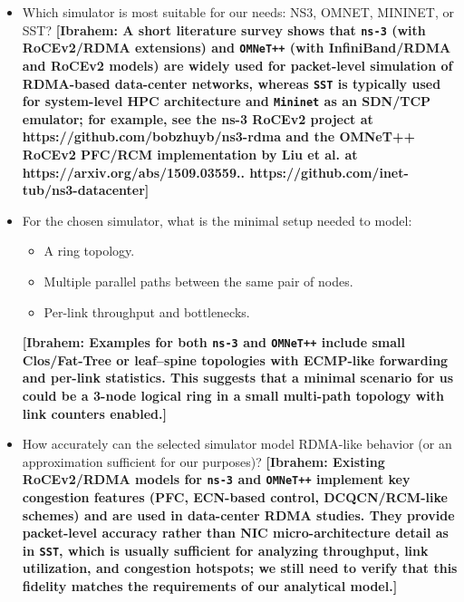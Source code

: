 \documentclass[12pt]{article}
\newcommand{\mycomm}[3]{{\color{#2} \textbf{[#1: #3]}}}
\newcommand{\Ibrahem}[1]{\mycomm{Ibrahem}{blue}{#1}}
\begin{document}
\begin{itemize}[leftmargin=*]
   \item Which simulator is most suitable for our needs: NS3, OMNET, MININET, or SST?
         \Ibrahem{A short literature survey shows that \texttt{ns-3} (with RoCEv2/RDMA extensions) and \texttt{OMNeT++} (with InfiniBand/RDMA and RoCEv2 models) are widely used for packet-level simulation of RDMA-based data-center networks, whereas \texttt{SST} is typically used for system-level HPC architecture and \texttt{Mininet} as an SDN/TCP emulator; for example, see the ns-3 RoCEv2 project at https://github.com/bobzhuyb/ns3-rdma and the OMNeT++ RoCEv2 PFC/RCM implementation by Liu et al. at https://arxiv.org/abs/1509.03559.. \newline https://github.com/inet-tub/ns3-datacenter}

      \item For the chosen simulator, what is the minimal setup needed to model:
        \begin{itemize}
            \item A ring topology.
            \item Multiple parallel paths between the same pair of nodes.
            \item Per-link throughput and bottlenecks.
        \end{itemize}
            \Ibrahem{Examples for both \texttt{ns-3} and \texttt{OMNeT++} include small Clos/Fat-Tree or leaf--spine topologies with ECMP-like forwarding and per-link statistics. This suggests that a minimal scenario for us could be a 3-node logical ring in a small multi-path topology with link counters enabled.}



  \item How accurately can the selected simulator model RDMA-like behavior (or an approximation sufficient for our purposes)?
                \Ibrahem{Existing RoCEv2/RDMA models for \texttt{ns-3} and \texttt{OMNeT++} implement key congestion features (PFC, ECN-based control, DCQCN/RCM-like schemes) and are used in data-center RDMA studies. They provide packet-level accuracy rather than NIC micro-architecture detail as in \texttt{SST}, which is usually sufficient for analyzing throughput, link utilization, and congestion hotspots; we still need to verify that this fidelity matches the requirements of our analytical model.}

\end{itemize}
\end{document}
